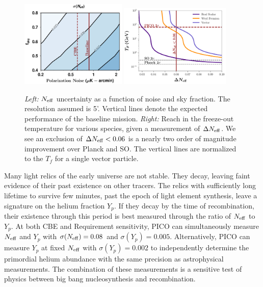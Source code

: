 \documentclass[PICOReport.tex]{subfiles}
\begin{document}
\begin{figure}[t!]
\begin{center}
\includegraphics[width=0.45\textwidth]{images/Neff_final.pdf}
\includegraphics[width=0.47\textwidth]{images/Tf_pico.pdf}
\vspace{-0.15in}
\caption{ \small \setlength{\baselineskip}{0.95\baselineskip}
\textit{Left:} ${N_{\rm eff}}$ uncertainty as a function of noise and sky fraction. The resolution assumed is 5'.   Vertical lines denote the expected performance of the baseline mission. \textit{Right:} Reach in the freeze-out temperature for various species, given a measurement of $\Delta {N_{\rm eff}}$.  We see an exclusion of $\Delta {N_{\rm eff}} < 0.06$ is a nearly two order of magnitude improvement over Planck and SO.  The vertical lines are normalized to the $T_f$ for a single vector particle.
\label{fig:Neff_future} }
\end{center}
\vspace{-0.15in}
\end{figure}

Many light relics of the early universe are not stable. They decay, leaving faint evidence of their past existence on other tracers. The relics with sufficiently long lifetime to survive few minutes, past the epoch of light element synthesis, leave a signature on the helium fraction $Y_p$.  If they decay by the time of recombination, their existence through this period is best measured through the ratio of ${N_{\rm eff}}$ to $Y_p$. At both CBE and Requirement sensitivity, PICO can simultaneously measure ${N_{\rm eff}}$ and $Y_p$ with $\sigma({N_{\rm eff}}) = 0.08$ and $\sigma(Y_p) =0.005$.  Alternatively, PICO can measure $Y_p$ at fixed ${N_{\rm eff}}$ with $\sigma(Y_p) =0.002$ to independently determine the primordial helium abundance with the same precision as astrophysical measurements.  The combination of these measurements is a sensitive test of physics between big bang nucleosynthesis and recombination.  
\end{document}

